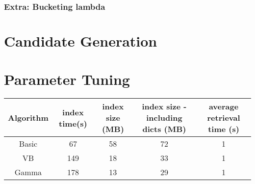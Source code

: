 \documentclass[10pt]{article}
\begin{document}
\subsubsection{Extra: Bucketing lambda}
\cite{chen1996empirical}
\section{Candidate Generation}

\section{Parameter Tuning}
\begin{table}[ht]
\begin{tabular}{| c | c | c | c | c |}
\hline
Algorithm & index time(s) & index size (MB) & index size - including dicts (MB) & average retrieval time (s)\\\hline
Basic & 67 & 58 & 72 & 1\\\hline
VB & 149 & 18 & 33 & 1\\\hline
Gamma & 178 & 13 & 29 & 1\\\hline
\end{tabular}
\end{table}



\end{document}
